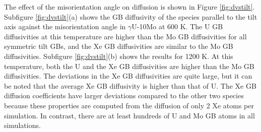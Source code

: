 \documentclass{elsarticle}
\begin{document}
The effect of the misorientation angle on diffusion is shown in Figure \ref{fig:dvstilt}. Subfigure \ref{fig:dvstilt}(a) shows the GB diffusivity of the species parallel to the tilt axis against the misorientation angle in $\gamma$U-10Mo at 600 K. The U GB diffusivities at this temperature are higher than the Mo GB diffusivities for all symmetric tilt GBs, and the Xe GB diffusivities are similar to the Mo GB diffusivities. Subfigure \ref{fig:dvstilt}(b) shows the results for 1200 K. At this temperature, both the U and the Xe GB diffusivities are higher than the Mo GB diffusivities. The deviations in the Xe GB diffusivities are quite large, but it can be noted that the average Xe GB diffusivity is higher than that of U. The Xe GB diffusion coefficients have larger deviations compared to the other two species because these properties are computed from the diffusion of only 2 Xe atoms per simulation. In contrast, there are at least hundreds of U and Mo GB atoms in all simulations.
\end{document}
